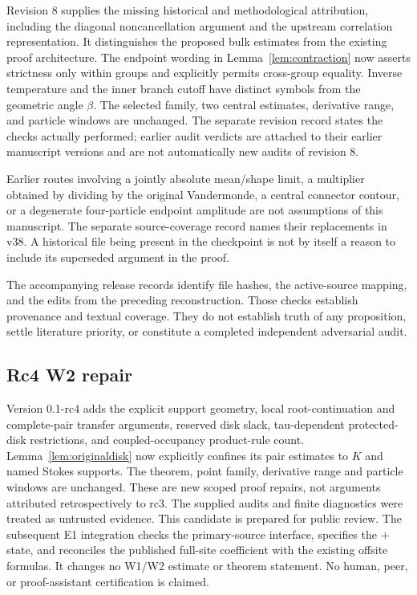 \documentclass[11pt]{article}
\numberwithin{equation}{section}
\theoremstyle{definition}
\begin{document}
Revision 8 supplies the missing historical and methodological
attribution, including the diagonal noncancellation argument and the
upstream correlation representation. It distinguishes the proposed
bulk estimates from the existing proof architecture. The endpoint
wording in Lemma~\ref{lem:contraction} now asserts strictness only
within groups and explicitly permits cross-group equality. Inverse
temperature and the inner branch cutoff have distinct symbols from
the geometric angle \(\beta\). The selected family, two central
estimates, derivative range, and particle windows are unchanged.
The separate revision record states the checks actually performed;
earlier audit verdicts are attached to their earlier manuscript
versions and are not automatically new audits of revision 8.

Earlier routes involving a jointly absolute mean/shape
limit, a multiplier obtained by dividing by the original
Vandermonde, a central connector contour, or a degenerate
four-particle endpoint amplitude are not assumptions of
this manuscript. The separate source-coverage record names
their replacements in v38. A historical file being
present in the checkpoint is not by itself a reason to
include its superseded argument in the proof.

The accompanying release records identify file hashes, the active-source
mapping, and the edits from the preceding reconstruction.
Those checks establish provenance and textual coverage.
They do not establish truth of any proposition, settle
literature priority, or constitute a completed independent
adversarial audit.


\subsection*{Rc4 W2 repair}
Version 0.1-rc4 adds the explicit support geometry,
local root-continuation and complete-pair transfer arguments,
reserved disk slack, tau-dependent protected-disk restrictions,
and coupled-occupancy product-rule count. Lemma~\ref{lem:originaldisk}
now explicitly confines its pair estimates to \(K\) and named
Stokes supports. The theorem, point family, derivative range and
particle windows are unchanged. These are new scoped proof repairs,
not arguments attributed retrospectively to rc3. The supplied
audits and finite diagnostics were treated as untrusted evidence.
This candidate is prepared for public review. The subsequent E1 integration
checks the primary-source interface, specifies the \(+\) state, and
reconciles the published full-site coefficient with the existing
offsite formulas. It changes no W1/W2 estimate or theorem statement.
No human, peer, or proof-assistant certification is claimed.
\end{document}
